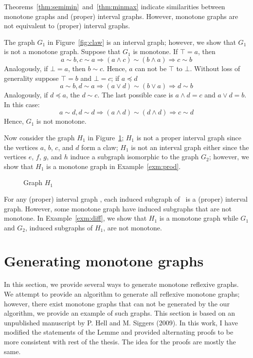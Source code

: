 Theorems~\ref{thm:semimin}~and~\ref{thm:minmax} indicate similarities between
monotone graphs and (proper) interval graphs. However, monotone graphs are not
equivalent to (proper) interval graphs.

\begin{example} \label{exm:diff}
The graph \(G_1\) in Figure~\ref{fig:claw} is an interval graph; however, we show that \(G_1\) is not a monotone graph.
Suppose that \(G_1\) is monotone. If \(\top = a\), then
\[a \sim b, c \sim a \Rightarrow (a \wedge c) \sim (b \wedge a) \Rightarrow c \sim b\]
Analogously, if \(\bot = a\), then \(b \sim c\)\@. Hence, \(a\) can not be \(\top\) to \(\bot\)\@.
Without loss of generality suppose \(\top = b\) and \(\bot = c\); if \(a \preceq d\)
\[a \sim b, d \sim a \Rightarrow (a \vee d) \sim (b \vee a) \Rightarrow d \sim b\]
Analogously, if \(d \preceq a\), the \(d \sim c\)\@. The last possible case is 
\(a \wedge d = c\) and \(a \vee d = b\). In this case:
\[a \sim d, d \sim d \Rightarrow (a \wedge d) \sim (d \wedge d) \Rightarrow c \sim d\]
Hence, \(G_1\) is not monotone. 

Now consider the graph \(H_1\) in Figure~\ref{fig:monnotpint};
\(H_1\) is not a proper interval graph since the vertices \(a\), \(b\), \(c\), and \(d\) form a claw;
\(H_1\) is not an interval graph either since the vertices \(e\), \(f\), \(g\), and \(h\) induce a subgraph isomorphic to the graph \(G_2\);
however, we show that \(H_1\) is a monotone graph in Example~\ref{exm:prod}.

\begin{figure}[h]
\center

\caption{Graph \ensuremath{H_1}} \label{fig:monnotpint}
\end{figure}
\end{example}

For any (proper) interval graph \mH, each induced subgraph of \mH\ is a 
(proper) interval graph. However, some monotone graph have induced subgraphs that are not monotone.
In Example~\ref{exm:diff}, we show that \(H_1\) is a monotone graph while \(G_1\) and \(G_2\), induced subgraphs of \(H_1\), are
not monotone.

\section{Generating monotone graphs}
In this section, we provide several ways to generate monotone reflexive graphs.
We attempt to provide an algorithm to generate all reflexive monotone graphs;
however, there exist monotone graphs that can not be generated by the our algorithm,
we provide an example of such graphs. This section is based on an unpublished
manuscript by P. Hell and M. Siggers (2009)\@. In this work, I have modified the
statements of the Lemme and provided alternating proofs to be more consistent with
rest of the thesis. The idea for the proofs are mostly the same.

